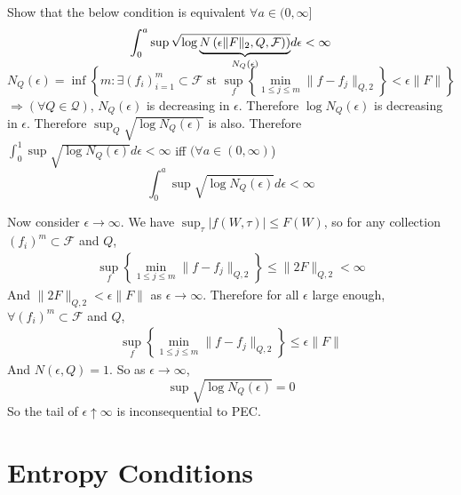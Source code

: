 \documentclass[11pt,letterpaper]{article}                  %
\begin{document}
\bigskip
\begin{problem}
Show that the below condition is equivalent $\forall a \in (0,\infty]$
\begin{equation*}
  \int_0^a \sup \sqrt{\smash[b]{  \log \underbrace{N\left(\epsilon
\|F\|_2,{Q},\mathcal{F})\right) }_{N_Q(\epsilon)}} }d\epsilon < \infty
\end{equation*}
\begin{equation*}
 N_Q(\epsilon) =\inf\left\{m:\exists (f_i)^m_{i=1} \subset \mathcal{F}\text{ st }
  \sup_f\left\{\min_{1\le j \le m}\|f-f_j\|_{Q,2}\right\} < \epsilon \|F\| \right\}
\end{equation*}
$\Rightarrow (\forall Q \in \mathcal{Q}) $, $N_Q(\epsilon)$ is
decreasing in $\epsilon$. Therefore $\log N_Q(\epsilon)$ is decreasing
in $\epsilon$. Therefore $\sup_{Q}\sqrt{\log N_Q(\epsilon)}$ is also.
Therefore $  \int_0^1 \sup \sqrt{  \log {N_Q(\epsilon)} } d\epsilon
< \infty$ iff $(\forall a \in (0,\infty)$)
\begin{equation*}
  \int_0^a \sup \sqrt{  \log {N_Q(\epsilon)} } d\epsilon < \infty
\end{equation*} 

Now consider $\epsilon \rightarrow \infty$. We have
$\sup_\tau|f(W,\tau)| \le F(W)$, so for any collection $(f_i)^m
\subset \mathcal{F}$ and $Q$, 
\begin{align*}
   \sup_f\left\{\min_{1\le j \le m}\|f-f_j\|_{Q,2}\right\}\le \|2F\|_{Q,2} < \infty
\end{align*}
And $\|2F\|_{Q,2} < \epsilon \|F \|$ as  $\epsilon \rightarrow
\infty$. Therefore for all $\epsilon$ large enough, $\forall (f_i)^m
\subset \mathcal{F}$ and $Q$,
\begin{align*}
   \sup_f\left\{\min_{1\le j \le m}\|f-f_j\|_{Q,2}\right\} \le
  \epsilon \|F\|
\end{align*}
And $N(\epsilon,Q)=1$. So as $\epsilon \rightarrow \infty$,
\begin{equation*}
   \sup \sqrt{  \log {N_Q(\epsilon)} } = 0
\end{equation*} 
So the tail of $\epsilon \uparrow \infty$ is inconsequential to PEC.

\end{problem}

\bigskip
\section{Entropy Conditions}
\end{document}
